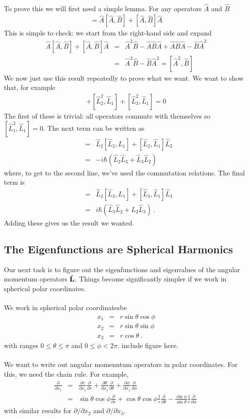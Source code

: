 \documentclass[12pt]{article}
\def\be{\begin{eqnarray}}
\def\ee{\end{eqnarray}}
\newcommand{\nn}{\nonumber}
\newcommand\para{\paragraph{}}
\newcommand{\ppp}[2]{\frac{\partial {#1}}{\partial {#2}}}
\newcommand{\co}{\color{olive}}
\newcommand{\cblue}{\color{blue}}
\begin{document}
{\para
{\co To prove this we will first need a simple lemma. For any operators $\hat{A}$ and $\hat{B}$ 
%
\be [\hat{A}^2,\hat{B}] = \hat{A}[\hat{A},\hat{B}] + [\hat{A},\hat{B}]\hat{A}\nn\ee
%
This is simple to check:  we start from the right-hand side and expand
%
\be \hat{A}[\hat{A},\hat{B}] + [\hat{A},\hat{B}]\hat{A} &=& \hat{A}^2\hat{B} - \hat{A}\hat{B}\hat{A} + \hat{A}\hat{B}\hat{A}-\hat{B}\hat{A}^2 \nn\\ &=& \hat{A}^2\hat{B} - \hat{B}\hat{A}^2 = [\hat{A}^2,\hat{B}]\nn\ee
%
We now just use this result repeatedly to prove what we want. We want to show that, for example
%
\be [\hat{L}_1^2,\hat{L}_1] +  [\hat{L}_2^2,\hat{L}_1] + [\hat{L}_3^2,\hat{L}_1] =0\nn\ee
%
}
The first of these is trivial: all operators commute with themselves so $[\hat{L}_1^2,\hat{L}_1]=0$. The next term can be written as 
%
{\co \be [\hat{L}_2^2,L_1] &=& \hat{L}_2[\hat{L}_2,L_1] + [\hat{L}_2,\hat{L}_1]\hat{L}_2 \nn\\ &=&
-i\hbar( \hat{L}_2\hat{L}_3 +\hat{L}_3\hat{L}_2)\label{l22}\ee
%
where, to get to the second line, we've used the commutation relations. The final term is
%
\be [\hat{L}_3^2,L_1] &=& \hat{L}_3[\hat{L}_3,L_1] + [\hat{L}_3,\hat{L}_1]\hat{L}_3 \nn\\ &=&
i\hbar( \hat{L}_3\hat{L}_2 + \hat{L}_2\hat{L}_3)\ . \label{l23}\ee
%
Adding these gives us the result we wanted.}






\subsection{The Eigenfunctions are Spherical Harmonics}\label{sphericalharmsec}




Our next task is to figure out the eigenfunctions and eigenvalues of the angular momentum operators $\hat{\bf L}$. Things become significantly simpler if we work in spherical polar coordinates. 

\para
{\co We work in spherical polar coordinatesbe
%
\be x_1 &=& r\sin\theta\cos\phi \nn\\  x_2 &=& r\sin\theta\sin\phi \nn\\  x_3 &=& r\cos\theta\ .\nn\ee
%
with ranges $0\leq \theta\leq \pi$ and $0\leq \phi < 2\pi$.} {\cblue include figure here.}






\para
{\co We want to write out angular momenntum operators in polar coordinates. For this, we need the chain rule. For example,
%
\be \ppp{}{x_1} &=& \ppp{r}{x_1}\ppp{}{r} + \ppp{\theta}{x_1}\ppp{}{\theta} + \ppp{\phi}{x_1}\ppp{}{\phi}\nn\\ 
&=& \sin\theta\cos\phi\ppp{}{r} + \cos\theta\cos\phi \frac{1}{r}\ppp{}{\theta} -\frac{\sin\phi}{\sin\theta} \frac{1}{r}\ppp{}{\phi}\ \nn\ee
%
with similar results for $\partial/\partial x_2$ and $\partial/\partial x_3$. 

}}
\end{document}
